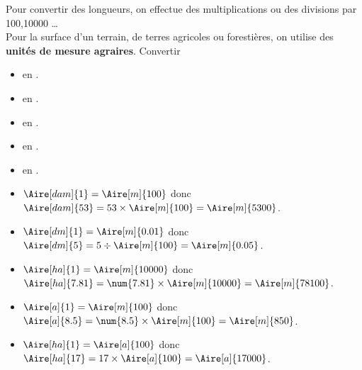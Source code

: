 \vspace*{-20mm}
\begin{changemargin}{0mm}{-20mm}
\begin{methode}
    Pour convertir des longueurs, on effectue des multiplications ou des divisions par 100,\num{10 000} \dots \\
    Pour la surface d'un terrain, de terres agricoles ou forestières, on utilise des \textbf{unités de mesure agraires}.
    \exercice
        Convertir 
        \begin{itemize}
            \item {} en \Aire[m]{}.
            \item {} en \Aire[m]{}.
            \item {} en \Aire[m]{}.
            \item {} en \Aire[m]{}.
            \item {} en \Aire[a]{}.
        \end{itemize}
    \correction
        \begin{itemize}
            \item $\Aire[dam]{1} = \Aire[m]{100}$   donc $\Aire[dam]{53}  = 53 \times \Aire[m]{100}           = \Aire[m]{5300}$.
            \item $\Aire[dm]{1}  = \Aire[m]{0.01}$  donc $\Aire[dm]{5}    = 5 \div \Aire[m]{100}              = \Aire[m]{0.05}$.
            \item $\Aire[ha]{1}  = \Aire[m]{10000}$ donc $\Aire[ha]{7.81} = \num{7.81} \times \Aire[m]{10000} = \Aire[m]{78100}$.
            \item $\Aire[a]{1}   = \Aire[m]{100}$   donc $\Aire[a]{8.5}   = \num{8.5} \times \Aire[m]{100}    = \Aire[m]{850}$.
            \item $\Aire[ha]{1}  = \Aire[a]{100}$   donc $\Aire[ha]{17}   = 17 \times \Aire[a]{100}           = \Aire[a]{17000}$.
        \end{itemize}
\end{methode}
\end{changemargin}
